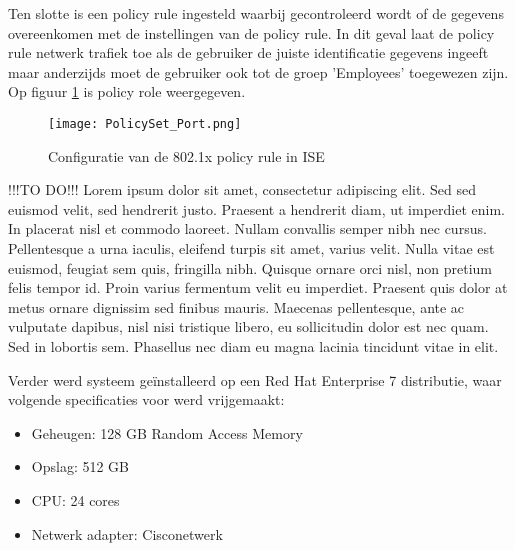  	Ten slotte is een policy rule ingesteld waarbij gecontroleerd wordt of de gegevens overeenkomen met de instellingen van de policy rule. In dit geval laat de policy rule netwerk trafiek toe als de gebruiker de juiste identificatie gegevens ingeeft maar anderzijds moet de gebruiker ook tot de groep 'Employees' toegewezen zijn. Op figuur \ref{fig:ISESwitch} is policy role weergegeven.
 	
	 	 \begin{figure}[H]
		\centering
		\texttt{[image: PolicySet\_Port.png]}
		\caption{Configuratie van de 802.1x policy rule in ISE}%
		\label{fig:ISESwitch}%
		\end{figure}

  \newline
	!!!TO DO!!! Lorem ipsum dolor sit amet, consectetur adipiscing elit. Sed sed euismod velit, sed hendrerit justo. Praesent a hendrerit diam, ut imperdiet enim. In placerat nisl et commodo laoreet. Nullam convallis semper nibh nec cursus. Pellentesque a urna iaculis, eleifend turpis sit amet, varius velit. Nulla vitae est euismod, feugiat sem quis, fringilla nibh. Quisque ornare orci nisl, non pretium felis tempor id. Proin varius fermentum velit eu imperdiet. Praesent quis dolor at metus ornare dignissim sed finibus mauris. Maecenas pellentesque, ante ac vulputate dapibus, nisl nisi tristique libero, eu sollicitudin dolor est nec quam. Sed in lobortis sem. Phasellus nec diam eu magna lacinia tincidunt vitae in elit.
 
Verder werd systeem geïnstalleerd op een Red Hat Enterprise 7 distributie, waar volgende specificaties voor werd vrijgemaakt: 

\begin{itemize}
	\item Geheugen: 128 GB Random Access Memory
	\item Opslag: 512 GB
	\item CPU: 24 cores
	\item Netwerk adapter: Cisco\textunderscore netwerk
\end{itemize}

